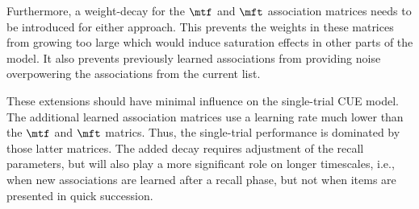 Furthermore, a weight-decay for the $\mtf$ and $\mft$ association matrices needs to be introduced for either approach.
This prevents the weights in these matrices from growing too large which would induce saturation effects in other parts of the model.
It also prevents previously learned associations from providing noise overpowering the associations from the current list.

These extensions should have minimal influence on the single-trial CUE model.
The additional learned association matrices use a learning rate much lower than the $\mtf$ and $\mft$ matrics.
Thus, the single-trial performance is dominated by those latter matrices.
The added decay requires adjustment of the recall parameters, but will also play a more significant role on longer timescales, i.e., when new associations are learned after a recall phase, but not when items are presented in quick succession.
